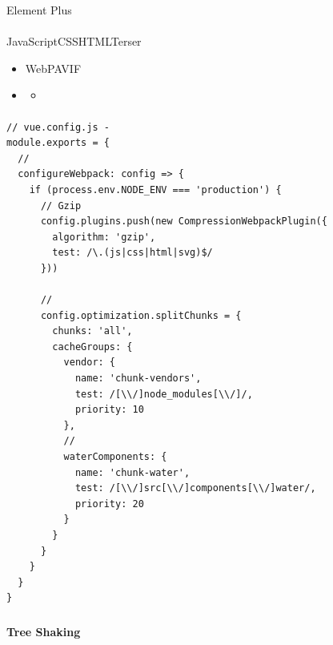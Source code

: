 Element Plus

\hypertarget{section-55}{%
\paragraph{}\label{section-55}}

\important{}JavaScriptCSSHTMLTerser

\important{}

\begin{itemize}
\item
  WebPAVIF
\item
  \begin{itemize}
  \tightlist
  \item
  \end{itemize}
\end{itemize}

\hypertarget{section-56}{%
\paragraph{}\label{section-56}}

\begin{lstlisting}[style=javascript]
// vue.config.js - 
module.exports = {
  // 
  configureWebpack: config => {
    if (process.env.NODE_ENV === 'production') {
      // Gzip
      config.plugins.push(new CompressionWebpackPlugin({
        algorithm: 'gzip',
        test: /\.(js|css|html|svg)$/
      }))
      
      // 
      config.optimization.splitChunks = {
        chunks: 'all',
        cacheGroups: {
          vendor: {
            name: 'chunk-vendors',
            test: /[\\/]node_modules[\\/]/,
            priority: 10
          },
          // 
          waterComponents: {
            name: 'chunk-water',
            test: /[\\/]src[\\/]components[\\/]water/,
            priority: 20
          }
        }
      }
    }
  }
}
\end{lstlisting}

\hypertarget{section-57}{%
\subsubsection{}\label{section-57}}

\hypertarget{tree-shaking}{%
\paragraph{Tree Shaking}\label{tree-shaking}}

